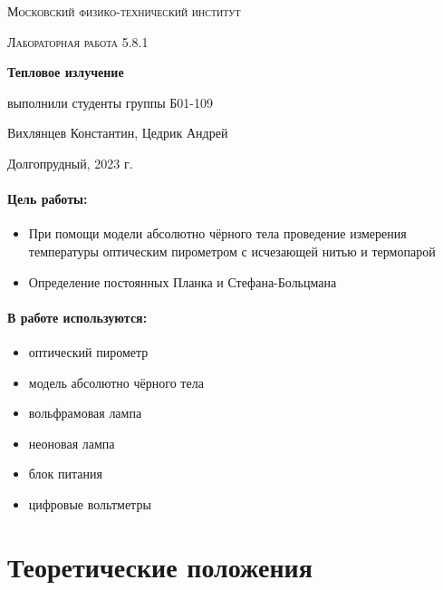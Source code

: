 \documentclass[a4paper, 12pt]{article}
\begin{document}
	
\begin{titlepage}
	\centering
	\vspace{5cm}
	{\scshape\LARGE Московский физико-технический институт \par}
	\vspace{4cm}
	{\scshape\Large Лабораторная работа 5.8.1 \par}
	\vspace{1cm}
	{\huge\bfseries Тепловое излучение \par}
	\vspace{1cm}
	\vfill
\begin{flushright}
	{\large выполнили студенты группы Б01-109}\par
	\vspace{0.3cm}
	{\LARGE Вихлянцев Константин, Цедрик Андрей}
\end{flushright}
	

	\vfill

	Долгопрудный, 2023 г.
\end{titlepage}

\paragraph*{Цель работы:} 
\begin{itemize}
    \item При помощи модели абсолютно чёрного тела проведение измерения температуры оптическим пирометром с исчезающей нитью и термопарой
    \item Определение постоянных Планка и Стефана-Больцмана
\end{itemize}

\paragraph*{В работе используются:}
\begin{itemize}
    \item оптический пирометр
    \item модель абсолютно чёрного тела
    \item вольфрамовая лампа
    \item неоновая лампа
    \item блок питания
    \item цифровые вольтметры
\end{itemize}

\section*{Теоретические положения}
\end{document}
